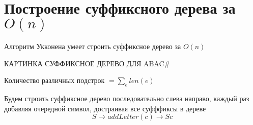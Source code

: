 
\section{Построение суффиксного дерева за $ O(n) $}

Алгоритм Укконена умеет строить суффиксное дерево за $O(n)$

КАРТИНКА СУФФИКСНОЕ ДЕРЕВО ДЛЯ ABAC\#\\

\begin{Rem}
	Количество различных подстрок $ = \sum\limits_{e} len(e) $
\end{Rem}

Будем строить суффиксное дерево последовательно слева направо, каждый раз добавляя очередной символ, достраивая все суфффиксы в дереве \\
$$ S \to addLetter(c) \to Sc $$

